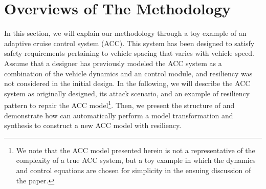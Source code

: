 
\section{Overviews of The Methodology}
%
%
%
In this section, we will explain our methodology through a toy example of an adaptive cruise control system (ACC). This system has been designed to satisfy safety requirements pertaining to vehicle spacing that varies with vehicle speed.
%
Assume that a designer has previously modeled the ACC system as a combination of the vehicle dynamics and an control module, and resiliency was not considered in the initial design. In the following, we will describe the ACC system as originally designed, its attack scenario, and an example of resiliency pattern to repair the ACC model\footnote{We note that the ACC model presented herein is not a representative of the complexity of a true ACC system, but a toy example in which the dynamics and control equations are chosen for simplicity in the ensuing discussion of the paper.}.
%
Then, we present the structure of \toolreaffirm and demonstrate how \toolreaffirm can automatically perform a model transformation and synthesis to construct a new ACC model with resiliency. 
%
%
%


